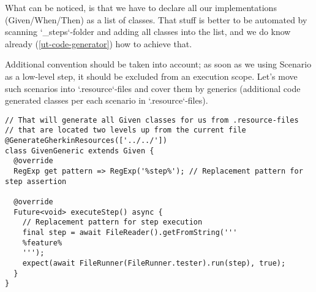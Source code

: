 
What can be noticed, is that we have to declare all our implementations (Given/When/Then) as a list of classes. 
That stuff is better to be automated by scanning `\_steps`-folder and adding all classes into the list, and we do 
know already (\ref{ut-code-generator}) how to achieve that.

Additional convention should be taken into account; as soon as we using Scenario as a low-level step, it should be
excluded from an execution scope. Let's move such scenarios into `.resource`-files and cover them by generics 
(additional code generated classes per each scenario in `.resource`-files).

\begin{lstlisting}
// That will generate all Given classes for us from .resource-files
// that are located two levels up from the current file
@GenerateGherkinResources(['../../'])
class GivenGeneric extends Given {
  @override
  RegExp get pattern => RegExp('%step%'); // Replacement pattern for step assertion

  @override
  Future<void> executeStep() async {
    // Replacement pattern for step execution
    final step = await FileReader().getFromString('''
    %feature%
    ''');
    expect(await FileRunner(FileRunner.tester).run(step), true);
  }
}
\end{lstlisting}
